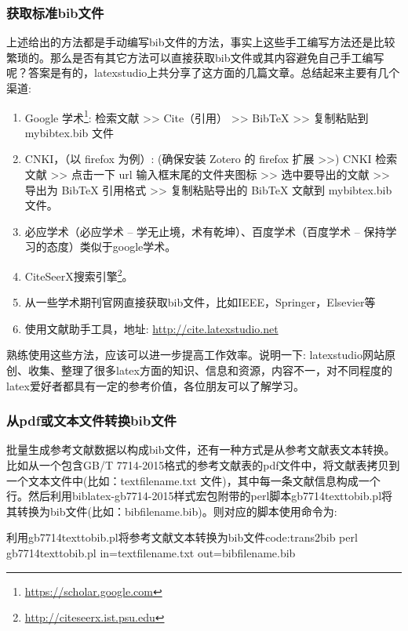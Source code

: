 \documentclass[twoside]{article} %
\begin{document}
\subsubsection{获取标准bib文件}
上述给出的方法都是手动编写bib文件的方法，事实上这些手工编写方法还是比较繁琐的。那么是否有其它方法可以直接获取bib文件或其内容避免自己手工编写呢？答案是有的，latexstudio上共分享了这方面的几篇文章\cite{北京交通大学研究生公众号2016--}\cite{olref2016--}\cite{文献助手2016--}。总结起来主要有几个渠道:
\begin{enumerate}
  \item Google 学术\footnote{\url{https://scholar.google.com}}: 检索文献 >> Cite（引用） >> BibTeX >> 复制粘贴到 mybibtex.bib 文件
  \item CNKI，（以 firefox 为例）: (确保安装 Zotero 的 firefox 扩展 >>) CNKI 检索文献 >> 点击一下 url 输入框末尾的文件夹图标 >> 选中要导出的文献 >> 导出为 BibTeX 引用格式 >> 复制粘贴导出的 BibTeX 文献到 mybibtex.bib 文件。
  \item 必应学术（必应学术 – 学无止境，术有乾坤）、百度学术（百度学术 – 保持学习的态度）类似于google学术。
  \item CiteSeerX搜索引擎\footnote{\url{http://citeseerx.ist.psu.edu}}。
  \item 从一些学术期刊官网直接获取bib文件，比如IEEE，Springer，Elsevier等
  \item 使用文献助手工具，地址: \url{http://cite.latexstudio.net}
\end{enumerate}

熟练使用这些方法，应该可以进一步提高工作效率。说明一下: latexstudio网站原创、收集、整理了很多latex方面的知识、信息和资源，内容不一，对不同程度的latex爱好者都具有一定的参考价值，各位朋友可以了解学习。


\subsubsection{从pdf或文本文件转换bib文件}
批量生成参考文献数据以构成bib文件，还有一种方式是从参考文献表文本转换。比如从一个包含GB/T 7714-2015格式的参考文献表的pdf文件中，将文献表拷贝到一个文本文件中(比如：textfilename.txt 文件)，其中每一条文献信息构成一个行。然后利用biblatex-gb7714-2015样式宏包附带的perl脚本gb7714texttobib.pl将其转换为bib文件(比如：bibfilename.bib)。则对应的脚本使用命令为:

\begin{codetex}{利用gb7714texttobib.pl将参考文献文本转换为bib文件}{code:trans2bib}
perl gb7714texttobib.pl in=textfilename.txt out=bibfilename.bib
\end{codetex}
\end{document}
